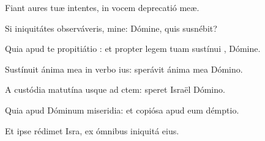 \item {}

\item Fiant aures tuæ intentes,\psstar{} in vocem deprecatió meæ.

\item Si iniquitátes observáveris, mine:\psstar{} Dómine, quis susnébit?

\item Quia apud te propitiátio :\psstar{} et propter legem tuam sustínui , Dómine.

\item Sustínuit ánima mea in verbo ius:\psstar{} sperávit ánima mea  Dómino.

\item A custódia matutína usque ad ctem:\psstar{} speret Israël  Dómino.

\item Quia apud Dóminum miseridia:\psstar{} et copiósa apud eum démptio.

\item Et ipse rédimet Isra,\psstar{} ex ómnibus iniquitá eius.
